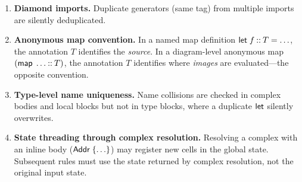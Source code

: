 \documentclass[acmsmall,screen,nonacm]{acmart}
\begin{document}
\begin{enumerate}
  \item \textbf{Diamond imports.} Duplicate generators (same tag) from
    multiple imports are silently deduplicated.

  \item \textbf{Anonymous map convention.} In a named map definition
    $\mathsf{let}\;f \mathbin{::} T = \ldots$, the annotation $T$ identifies
    the \emph{source}. In a diagram-level anonymous map
    $(\mathsf{map}\;\ldots \mathbin{::} T)$, the annotation $T$ identifies
    where \emph{images} are evaluated---the opposite convention.

  \item \textbf{Type-level name uniqueness.} Name collisions are checked
    in complex bodies and local blocks but not in type blocks, where a
    duplicate $\mathsf{let}$ silently overwrites.

  \item \textbf{State threading through complex resolution.} Resolving
    a complex with an inline body ($\textsf{Addr}\;\{\ldots\}$) may register new
    cells in the global state. Subsequent rules must use the state
    returned by complex resolution, not the original input state.
\end{enumerate}
\end{document}
